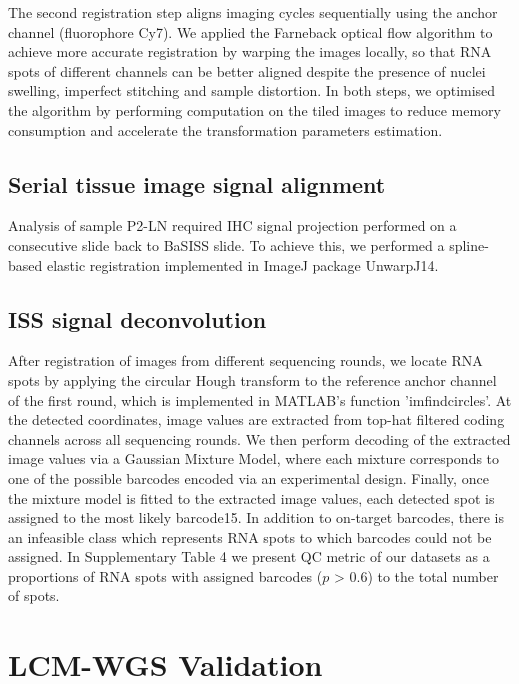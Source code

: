 The second registration step aligns imaging cycles sequentially using the anchor channel (fluorophore Cy7). We applied the Farneback optical flow algorithm to achieve more accurate registration by warping the images locally, so that RNA spots of different channels can be better aligned despite the presence of nuclei swelling, imperfect stitching and sample distortion. In both steps, we optimised the algorithm by performing computation on the tiled images to reduce memory consumption and accelerate the transformation parameters estimation.

\subsection{Serial tissue image signal alignment}
\label{sec:protocol-suppl-image-align}

Analysis of sample P2-LN required \ac{IHC} signal projection performed on a consecutive slide back to \ac{BaSISS} slide. To achieve this, we performed a spline-based elastic registration implemented in ImageJ package UnwarpJ14. 

\subsection{\ac{ISS} signal deconvolution}
\label{sec:protocol-suppl-image-deconvolution}

After registration of images from different sequencing rounds, we locate RNA spots by applying the circular Hough transform to the reference anchor channel of the first round, which is implemented in MATLAB's function 'imfindcircles'. At the detected coordinates, image values are extracted from top-hat filtered coding channels across all sequencing rounds. We then perform decoding of the extracted image values via a Gaussian Mixture Model, where each mixture corresponds to one of the possible barcodes encoded via an experimental design. Finally, once the mixture model is fitted to the extracted image values, each detected spot is assigned to the most likely barcode15. In addition to on-target barcodes, there is an infeasible class which represents RNA spots to which barcodes could not be assigned. In Supplementary Table 4 we present QC metric of our datasets as a proportions of RNA spots with assigned barcodes ($p$ > 0.6) to the total number of spots. 

\section{\acs{LCM}-\acs{WGS} Validation}
\label{sec:protocol-suppl-lcm-wgs}

